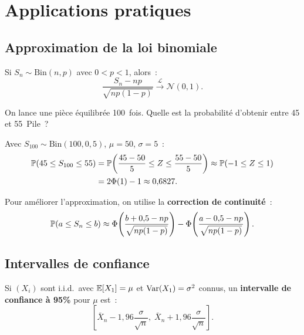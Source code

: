 \section{Applications pratiques}

\subsection{Approximation de la loi binomiale}

\begin{corollaire}
Si $S_n \sim \text{Bin}(n, p)$ avec $0 < p < 1$, alors~:
\[
    \frac{S_n - np}{\sqrt{np(1-p)}} \xrightarrow{\mathcal{L}} \mathcal{N}(0,1).
\]
\end{corollaire}

\begin{exemple}
On lance une pi\`ece \'equilibr\'ee 100~fois. Quelle est la probabilit\'e
d'obtenir entre 45 et 55~Pile~?

Avec $S_{100} \sim \text{Bin}(100, 0{,}5)$, $\mu = 50$, $\sigma = 5$~:
\begin{align*}
    \mathbb{P}(45 \leq S_{100} \leq 55) &= \mathbb{P}\!\left(\frac{45 - 50}{5} \leq Z \leq \frac{55-50}{5}\right)
    \approx \mathbb{P}(-1 \leq Z \leq 1) \\
    &= 2\Phi(1) - 1 \approx 0{,}6827.
\end{align*}
\end{exemple}

\begin{attention}[title=\textbf{Correction de continuit\'e}]
Pour am\'eliorer l'approximation, on utilise la \textbf{correction de continuit\'e}~:
\[
    \mathbb{P}(a \leq S_n \leq b) \approx \Phi\!\left(\frac{b + 0{,}5 - np}{\sqrt{np(1-p)}}\right)
    - \Phi\!\left(\frac{a - 0{,}5 - np}{\sqrt{np(1-p)}}\right).
\]
\end{attention}

\subsection{Intervalles de confiance}

\begin{corollaire}
Si $(X_i)$ sont i.i.d.\ avec $\mathbb{E}[X_1] = \mu$ et $\mathrm{Var}(X_1) = \sigma^2$ connus,
un \textbf{intervalle de confiance \`a 95\%} pour $\mu$ est~:
\[
    \left[\bar{X}_n - 1{,}96\frac{\sigma}{\sqrt{n}},\;
    \bar{X}_n + 1{,}96\frac{\sigma}{\sqrt{n}}\right].
\]
\end{corollaire}

